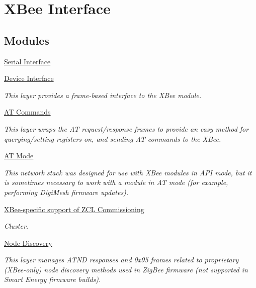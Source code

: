 \hypertarget{group__xbee}{\section{X\-Bee Interface}
\label{group__xbee}
}
\subsection*{Modules}
\begin{DoxyCompactItemize}
\item 
\hyperlink{group__xbee__serial}{Serial Interface}
\item 
\hyperlink{group__xbee__device}{Device Interface}
\begin{DoxyCompactList}\small\item\em This layer provides a frame-\/based interface to the X\-Bee module. \end{DoxyCompactList}\item 
\hyperlink{group__xbee__atcmd}{A\-T Commands}
\begin{DoxyCompactList}\small\item\em This layer wraps the A\-T request/response frames to provide an easy method for querying/setting registers on, and sending A\-T commands to the X\-Bee. \end{DoxyCompactList}\item 
\hyperlink{group__xbee__atmode}{A\-T Mode}
\begin{DoxyCompactList}\small\item\em This network stack was designed for use with X\-Bee modules in A\-P\-I mode, but it is sometimes necessary to work with a module in A\-T mode (for example, performing Digi\-Mesh firmware updates). \end{DoxyCompactList}\item 
\hyperlink{group__xbee__commissioning}{X\-Bee-\/specific support of Z\-C\-L Commissioning}
\begin{DoxyCompactList}\small\item\em Cluster. \end{DoxyCompactList}\item 
\hyperlink{group__xbee__discovery}{Node Discovery}
\begin{DoxyCompactList}\small\item\em This layer manages A\-T\-N\-D responses and 0x95 frames related to proprietary (X\-Bee-\/only) node discovery methods used in Zig\-Bee firmware (not supported in Smart Energy firmware builds). \end{DoxyCompactList}\item 

\end{DoxyCompactItemize}
